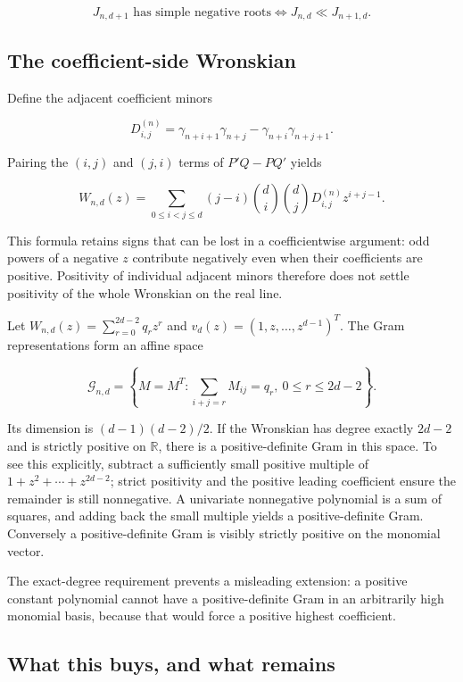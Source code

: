 \documentclass[
  10pt,
  a4paper,
  10pt,
  oneside,
  openany]{book}
\begin{document}
\[
 J_{n,d+1}\text{ has simple negative roots}
 \iff J_{n,d}\ll J_{n+1,d}.
 \tag{29.4}\label{eq:29.4}
\]

\subsection{The coefficient-side
Wronskian}\label{the-coefficient-side-wronskian}

Define the adjacent coefficient minors

\[
 D_{i,j}^{(n)}=
 \gamma_{n+i+1}\gamma_{n+j}
 -\gamma_{n+i}\gamma_{n+j+1}.
\]

Pairing the \((i,j)\) and \((j,i)\) terms of \(P'Q-PQ'\) yields

\[
 W_{n,d}(z)=
 \sum_{0\le i<j\le d}
 (j-i)\binom di\binom djD_{i,j}^{(n)}z^{i+j-1}.
 \tag{29.5}\label{eq:29.5}
\]

This formula retains signs that can be lost in a coefficientwise
argument: odd powers of a negative \(z\) contribute negatively even when
their coefficients are positive. Positivity of individual adjacent
minors therefore does not settle positivity of the whole Wronskian on
the real line.

Let \(W_{n,d}(z)=\sum_{r=0}^{2d-2}q_rz^r\) and
\(v_d(z)=(1,z,\ldots,z^{d-1})^T\). The Gram representations form an
affine space

\[
 \mathcal G_{n,d}=
 \left\{M=M^T:\sum_{i+j=r}M_{ij}=q_r,
 \ 0\le r\le2d-2\right\}.
 \tag{29.6}\label{eq:29.6}
\]

Its dimension is \((d-1)(d-2)/2\). If the Wronskian has degree exactly
\(2d-2\) and is strictly positive on \(\mathbb R\), there is a
positive-definite Gram in this space. To see this explicitly, subtract a
sufficiently small positive multiple of \(1+z^2+\cdots+z^{2d-2}\);
strict positivity and the positive leading coefficient ensure the
remainder is still nonnegative. A univariate nonnegative polynomial is a
sum of squares, and adding back the small multiple yields a
positive-definite Gram. Conversely a positive-definite Gram is visibly
strictly positive on the monomial vector.

The exact-degree requirement prevents a misleading extension: a positive
constant polynomial cannot have a positive-definite Gram in an
arbitrarily high monomial basis, because that would force a positive
highest coefficient.

\subsection{What this buys, and what
remains}\label{what-this-buys-and-what-remains}
\end{document}
